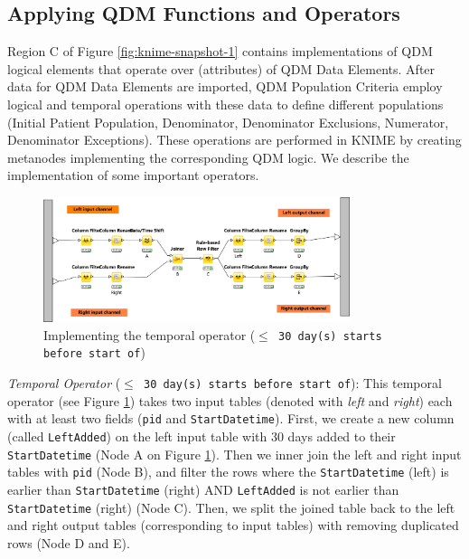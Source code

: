 \documentclass{article}
\begin{document}
\subsection{Applying QDM Functions and Operators}

Region C of Figure \ref{fig:knime-snapshot-1} contains implementations of QDM logical elements that operate over (attributes) of QDM Data Elements. After data for QDM Data Elements are imported, QDM Population Criteria employ logical and temporal operations with these data to define different populations (Initial Patient Population, Denominator, Denominator Exclusions, Numerator, Denominator Exceptions). These operations are performed in KNIME by creating metanodes implementing the corresponding QDM logic. We describe the implementation of some important operators.

\begin{figure}
\centering
	\includegraphics[width=0.8\textwidth]{figures/knime-snapshot-2.png}
	\caption{Implementing the temporal operator (\texttt{$\leq$ 30 day(s) starts before start of})}\label{fig:knime-snapshot-2}
\end{figure}
\vspace{5pt}

\textit{Temporal Operator} (\texttt{$\leq$ 30 day(s) starts before start of}):
This temporal operator (see Figure \ref{fig:knime-snapshot-2}) takes two input tables (denoted with \emph{left} and \emph{right}) each with at least two fields (\texttt{pid} and \texttt{StartDatetime}). First, we create a new column (called \texttt{LeftAdded}) on the left input table with 30 days added to their \texttt{StartDatetime} (Node A on Figure \ref{fig:knime-snapshot-2}). Then we inner join the left and right input tables with \texttt{pid} (Node B), and filter the rows where the \texttt{StartDatetime} (left) is earlier than \texttt{StartDatetime} (right) AND \texttt{LeftAdded} is not earlier than \texttt{StartDatetime} (right) (Node C). Then, we split the joined table back to the left and right output tables (corresponding to input tables) with removing duplicated rows (Node D and E).
\end{document}
